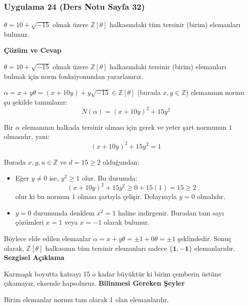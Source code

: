 \documentclass[11pt, a4paper]{article}
\newenvironment{cozum}{
    \vspace{0.5cm}
    \noindent\textcolor{green!60!black}{\faCheckCircle\enspace \textbf{\Large Çözüm ve Cevap}}\par\vspace{0.2cm}
}{}
\newenvironment{sezgisel}{
    \vspace{0.5cm}
    \noindent\textcolor{orange!80!black}{\faLightbulb\enspace \textbf{\Large Sezgisel Açıklama}}\par\vspace{0.2cm}
    \itshape
}{}
\newenvironment{bilgi}{
    \vspace{0.5cm}
    \noindent\textcolor{red!70!black}{\faExclamationTriangle\enspace \textbf{\Large Bilinmesi Gereken Şeyler}}\par\vspace{0.2cm}
}{}
\begin{document}
\subsubsection{Uygulama 24 (Ders Notu Sayfa 32)}
\begin{sorubox}
$\theta = 10 + \sqrt{-15}$ olmak üzere $\mathbb{Z}[\theta]$ halkasındaki tüm tersinir (birim) elemanları bulunuz.
\end{sorubox}
\begin{cozum}
$\theta = 10 + \sqrt{-15}$ olmak üzere $\mathbb{Z}[\theta]$ halkasındaki tersinir (birim) elemanları bulmak için norm fonksiyonundan yararlanırız.

$\alpha = x + y\theta = (x + 10y) + y\sqrt{-15} \in \mathbb{Z}[\theta]$ (burada $x, y \in \mathbb{Z}$) elemanının normu şu şekilde tanımlanır:
\[ N(\alpha) = (x + 10y)^2 + 15 y^2 \]

Bir $\alpha$ elemanının halkada tersinir olması için gerek ve yeter şart normunun $1$ olmasıdır, yani:
\[ (x + 10y)^2 + 15 y^2 = 1 \]

Burada $x, y, u \in \mathbb{Z}$ ve $d = 15 \ge 2$ olduğundan:
\begin{itemize}
    \item Eğer $y \neq 0$ ise, $y^2 \ge 1$ olur. Bu durumda:
    \[ (x + 10y)^2 + 15 y^2 \ge 0 + 15(1) = 15 \ge 2 \]
    olur ki bu normun $1$ olması şartıyla çelişir. Dolayısıyla $y = 0$ olmalıdır.
    \item $y = 0$ durumunda denklem $x^2 = 1$ haline indirgenir. Buradan tam sayı çözümleri $x = 1$ veya $x = -1$ olarak bulunur.
\end{itemize}

Böylece elde edilen elemanlar $\alpha = x + y\theta = \pm 1 + 0\theta = \pm 1$ şeklindedir. Sonuç olarak, $\mathbb{Z}[\theta]$ halkasının tüm tersinir elemanları sadece $\mathbf{\{1, -1\}}$ elemanlarıdır.
\end{cozum}
\begin{sezgisel}
Karmaşık boyutta katsayı 15 o kadar büyüktür ki birim çemberin üstüne çıkamayız, eksende hapsoluruz.
\end{sezgisel}
\begin{bilgi}
Birim elemanlar normu tam olarak 1 olan elemanlardır.
\end{bilgi}

\newpage
\end{document}
